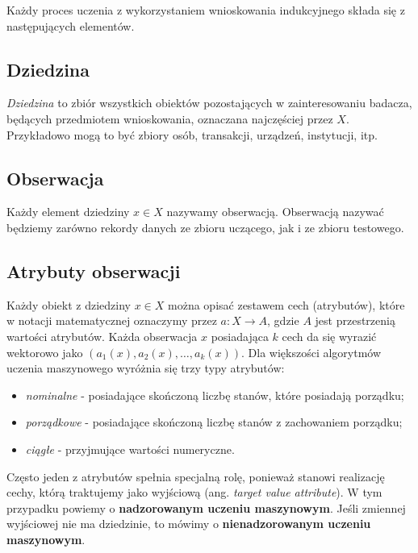 \documentclass[
]{book}
\providecommand{\tightlist}{%
  \setlength{\itemsep}{0pt}\setlength{\parskip}{0pt}}
\theoremstyle{plain}
\theoremstyle{definition}
\theoremstyle{definition}
\theoremstyle{definition}
\theoremstyle{definition}
\theoremstyle{remark}
\begin{document}
Każdy proces uczenia z wykorzystaniem wnioskowania indukcyjnego składa się z następujących elementów.

\hypertarget{dziedzina}{%
\subsection{Dziedzina}\label{dziedzina}}

\emph{Dziedzina} to zbiór wszystkich obiektów pozostających w zainteresowaniu badacza, będących przedmiotem wnioskowania, oznaczana najczęściej przez \(X\). Przykładowo mogą to być zbiory osób, transakcji, urządzeń, instytucji, itp.

\hypertarget{obserwacja}{%
\subsection{Obserwacja}\label{obserwacja}}

Każdy element dziedziny \(x\in X\) nazywamy obserwacją. Obserwacją nazywać będziemy zarówno rekordy danych ze zbioru uczącego, jak i ze zbioru testowego.

\hypertarget{atrybuty-obserwacji}{%
\subsection{Atrybuty obserwacji}\label{atrybuty-obserwacji}}

Każdy obiekt z dziedziny \(x\in X\) można opisać zestawem cech (atrybutów), które w notacji matematycznej oznaczymy przez \(a:X\to A\), gdzie \(A\) jest przestrzenią wartości atrybutów. Każda obserwacja \(x\) posiadająca \(k\) cech da się wyrazić wektorowo jako \((a_1(x), a_2(x), \ldots, a_k(x))\). Dla większości algorytmów uczenia maszynowego wyróżnia się trzy typy atrybutów:

\begin{itemize}
\tightlist
\item
  \emph{nominalne} - posiadające skończoną liczbę stanów, które posiadają porządku;
\item
  \emph{porządkowe} - posiadające skończoną liczbę stanów z zachowaniem porządku;
\item
  \emph{ciągłe} - przyjmujące wartości numeryczne.
\end{itemize}

Często jeden z atrybutów spełnia specjalną rolę, ponieważ stanowi realizację cechy, którą traktujemy jako wyjściową (ang. \emph{target value attribute}). W tym przypadku powiemy o \textbf{nadzorowanym uczeniu maszynowym}. Jeśli zmiennej wyjściowej nie ma dziedzinie, to mówimy o \textbf{nienadzorowanym uczeniu maszynowym}.
\end{document}

